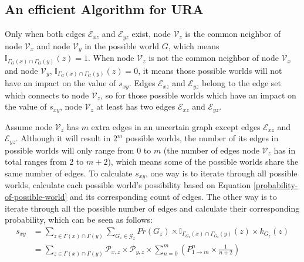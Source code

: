\documentclass[\main/thesis.tex]{subfiles}
\begin{document}
\subsection{An efficient Algorithm for URA}

Only when both edges $\mathcal{E}_{xz}$ and $\mathcal{E}_{yz}$ exist, node $\mathcal{V}_z$ is the common neighbor of node $\mathcal{V}_x$ and node $\mathcal{V}_y$ in the possible world $G$, which means $\mathbb{I}_{\Gamma_G(x)\cap\Gamma_G(y)}(z)=1$. When node $\mathcal{V}_z$ is not the common neighbor of node $\mathcal{V}_x$ and node $\mathcal{V}_y$, $\mathbb{I}_{\Gamma_G(x)\cap\Gamma_G(y)}(z)=0$, it means those possible worlds will not have an impact on the value of $s_{xy}$. Edges $\mathcal{E}_{xz}$ and $\mathcal{E}_{yz}$ belong to the edge set which connects to node $\mathcal{V}_z$, so for those possible worlds which have an impact on the value of $s_{xy}$, node $\mathcal{V}_z$ at least has two edges $\mathcal{E}_{xz}$ and $\mathcal{E}_{yz}$.

Assume node $\mathcal{V}_z$ has $m$ extra edges in an uncertain graph except edges $\mathcal{E}_{xz}$ and $\mathcal{E}_{yz}$. Although it will result in $2^m$ possible worlds, the number of its edges in possible worlds will only range from 0 to $m$ (the number of edges node $\mathcal{V}_z$ has in total ranges from 2 to $m+2$), which means some of the possible worlds share the same number of edges. To calculate $s_{xy}$, one way is to iterate through all possible worlds, calculate each possible world's possibility based on Equation \ref{probability-of-possible-world} and its corresponding count of edges. The other way is to iterate through all the possible number of edges and calculate their corresponding probability, which can be seen as follows:
\begin{align*}
s_{xy}&=\sum_{z\in \Gamma(x)\cap\Gamma(y)}\sum_{{G_z}\in \mathcal{G}_z}Pr({G_z})\times\mathbb{I}_{\Gamma_{G_z}(x)\cap\Gamma_{G_z}(y)}(z)\times k_{G_z}(z)\\
&=\sum_{z\in \Gamma(x)\cap\Gamma(y)}\mathcal{P}_{x,z}\times\mathcal{P}_{y,z} \times \sum_{n=0}^{m}(P_{1\rightarrow m}^n \times \frac{1}{n+2})
\end{align*}

\end{document}

